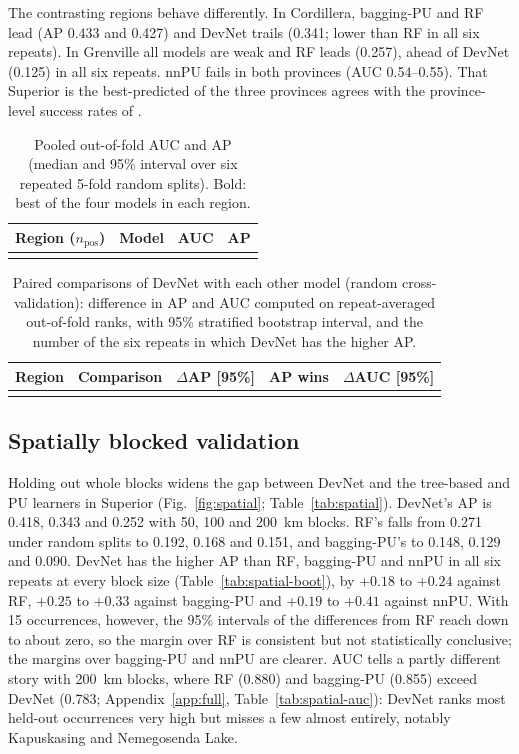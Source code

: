 \documentclass[pdflatex,sn-apa]{sn-jnl}
\begin{document}
The contrasting regions behave differently. In Cordillera, bagging-PU and RF lead (AP 0.433 and 0.427) and DevNet trails (0.341; lower than RF in all six repeats). In Grenville all models are weak and RF leads (0.257), ahead of DevNet (0.125) in all six repeats. nnPU fails in both provinces (AUC 0.54--0.55). That Superior is the best-predicted of the three provinces agrees with the province-level success rates of \citet{Parsa2024}.

\begin{table}[t]
\caption{Pooled out-of-fold AUC and AP (median and 95\% interval over six repeated 5-fold random splits). Bold: best of the four models in each region.}\label{tab:benchmark}
\footnotesize
\begin{tabular*}{\textwidth}{@{\extracolsep\fill}llcc}
\toprule
Region ($n_{\mathrm{pos}}$) & Model & AUC & AP \\
\midrule
\botrule
\end{tabular*}
\end{table}

\begin{table}[t]
\caption{Paired comparisons of DevNet with each other model (random cross-validation): difference in AP and AUC computed on repeat-averaged out-of-fold ranks, with 95\% stratified bootstrap interval, and the number of the six repeats in which DevNet has the higher AP.}\label{tab:bootstrap}
\footnotesize
\setlength{\tabcolsep}{3pt}
\begin{tabular*}{\textwidth}{@{\extracolsep\fill}llccc}
\toprule
Region & Comparison & $\Delta$AP [95\%] & AP wins & $\Delta$AUC [95\%] \\
\midrule
\botrule
\end{tabular*}
\end{table}

\subsection{Spatially blocked validation}\label{sec:res-spatial}

Holding out whole blocks widens the gap between DevNet and the tree-based and PU learners in Superior (Fig.~\ref{fig:spatial}; Table~\ref{tab:spatial}). DevNet's AP is 0.418, 0.343 and 0.252 with 50, 100 and 200~km blocks. RF's falls from 0.271 under random splits to 0.192, 0.168 and 0.151, and bagging-PU's to 0.148, 0.129 and 0.090. DevNet has the higher AP than RF, bagging-PU and nnPU in all six repeats at every block size (Table~\ref{tab:spatial-boot}), by $+0.18$ to $+0.24$ against RF, $+0.25$ to $+0.33$ against bagging-PU and $+0.19$ to $+0.41$ against nnPU. With 15 occurrences, however, the 95\% intervals of the differences from RF reach down to about zero, so the margin over RF is consistent but not statistically conclusive; the margins over bagging-PU and nnPU are clearer. AUC tells a partly different story with 200~km blocks, where RF (0.880) and bagging-PU (0.855) exceed DevNet (0.783; Appendix~\ref{app:full}, Table~\ref{tab:spatial-auc}): DevNet ranks most held-out occurrences very high but misses a few almost entirely, notably Kapuskasing and Nemegosenda Lake.
\end{document}

